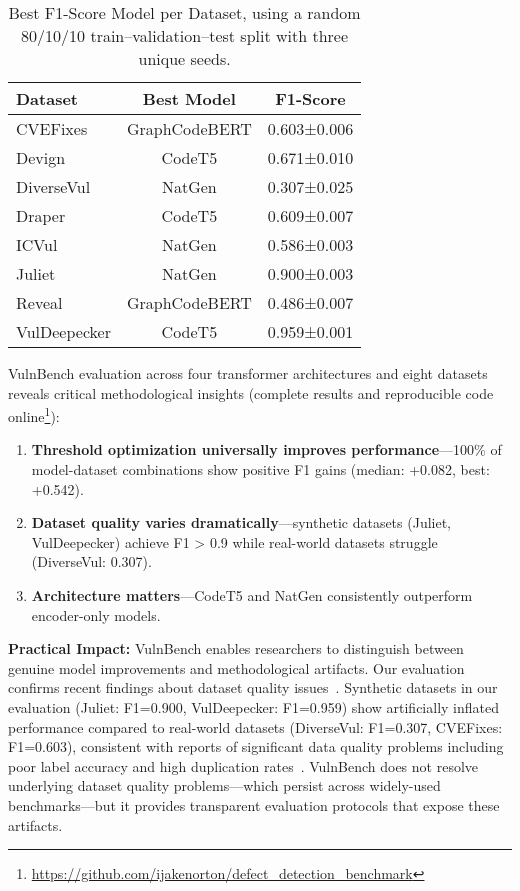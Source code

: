 \documentclass[letterpaper]{article}
\begin{document}
\begin{table}[ht]
	\centering
	\caption{Best F1-Score Model per Dataset, using a random 80/10/10 train–validation–test split with three unique seeds.}
	\label{tab:results}
	\begin{tabular}{lcc}
		\toprule
		Dataset      & Best Model    & F1-Score    \\
		\midrule
		CVEFixes     & GraphCodeBERT & 0.603±0.006 \\
		Devign       & CodeT5        & 0.671±0.010 \\
		DiverseVul   & NatGen        & 0.307±0.025 \\
		Draper       & CodeT5        & 0.609±0.007 \\
		ICVul        & NatGen        & 0.586±0.003 \\
		Juliet       & NatGen        & 0.900±0.003 \\
		Reveal       & GraphCodeBERT & 0.486±0.007 \\
		VulDeepecker & CodeT5        & 0.959±0.001 \\
		\bottomrule
	\end{tabular}
\end{table}

VulnBench evaluation across four transformer architectures and eight datasets reveals critical methodological insights
(complete results and reproducible code online\footnote{\url{https://github.com/ijakenorton/defect_detection_benchmark}}):
\begin{enumerate}
	\item \textbf{Threshold optimization universally improves performance}---100\% of model-dataset combinations show positive F1 gains (median: +0.082, best: +0.542).
	\item \textbf{Dataset quality varies dramatically}---synthetic datasets (Juliet, VulDeepecker) achieve F1 > 0.9 while real-world datasets struggle (DiverseVul: 0.307).
	\item \textbf{Architecture matters}---CodeT5 and NatGen consistently outperform encoder-only models.
\end{enumerate}


\textbf{Practical Impact:} VulnBench enables researchers to distinguish between genuine model improvements and methodological artifacts. Our evaluation confirms recent findings about dataset quality issues~\citep{ding2025vulnerability,chen2023diversevul}. Synthetic datasets in our evaluation (Juliet: F1=0.900, VulDeepecker: F1=0.959) show artificially inflated performance compared to real-world datasets (DiverseVul: F1=0.307, CVEFixes: F1=0.603), consistent with reports of significant data quality problems including poor label accuracy and high duplication rates~\cite{ding2025vulnerability}. VulnBench does not resolve underlying dataset quality problems---which persist across widely-used benchmarks---but it provides transparent evaluation protocols that expose these artifacts.
\end{document}
